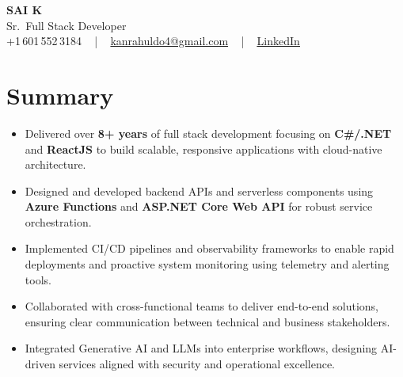 \documentclass[letterpaper,11pt]{article}
\newcommand{\resumeItem}[1]{
  \item\footnotesize{
    {#1 \vspace{-2pt}}
  }
}
\newcommand{\resumeItemListStart}{\begin{itemize}[leftmargin=*]}
\newcommand{\resumeItemListEnd}{\end{itemize}\vspace{-5pt}}
\begin{document}
\begin{center}
    {\fontsize{14pt}{12pt}\selectfont \textbf{\MakeUppercase{Sai K}}}\\ \vspace{2pt}
    \fontsize{10pt}{12pt}\selectfont Sr.\ Full Stack Developer\\ \vspace{2pt}
    \fontsize{10pt}{12pt}\selectfont +1\,601\,552\,3184 ~ | ~
    \href{mailto:kanrahuldo4@gmail.com}{kanrahuldo4@gmail.com} ~ | ~
    \href{https://www.linkedin.com/in/srrrk/}{\color{blue}\underline{LinkedIn}}
    \vspace{-10pt}
\end{center}

\section{Summary}
\fontsize{9pt}{10pt}\selectfont
\resumeItemListStart
  \resumeItem{Delivered over \textbf{8+ years} of full stack development focusing on \textbf{C\#/.NET} and \textbf{ReactJS} to build scalable, responsive applications with cloud-native architecture.}
  \resumeItem{Designed and developed backend APIs and serverless components using \textbf{Azure Functions} and \textbf{ASP.NET Core Web API} for robust service orchestration.}
  \resumeItem{Implemented CI/CD pipelines and observability frameworks to enable rapid deployments and proactive system monitoring using telemetry and alerting tools.}
  \resumeItem{Collaborated with cross-functional teams to deliver end-to-end solutions, ensuring clear communication between technical and business stakeholders.}
  \resumeItem{Integrated Generative AI and LLMs into enterprise workflows, designing AI-driven services aligned with security and operational excellence.}
\resumeItemListEnd
\vspace{-6pt}

\end{document}
